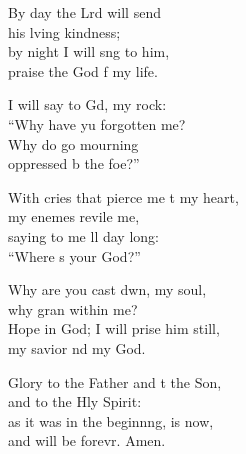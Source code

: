 \begin{psalmverse}[\versewidth]
\begin{patverse}
By day the Lrd will send\Med\\
his lving kindness;\\
by night I will s\pointup{\i}ng to him,\Med\\
praise the God f my life.

I will say to Gd, my rock:\Med\\
“Why have yu forgotten me?\\
Why do  go mourning\Med\\
oppressed b the foe?”

With cries that pierce me t my heart,\Med\\
my enem\pointup{\i}es revile me,\\
saying to me ll day long:\Med\\
“Where \pointup{\i}s your God?”

Why are you cast dwn, my soul,\Med\\
why gran within me?\\
Hope in God; I will prise him still,\Med\\
my savior nd my God.

Glory to the Father and t the Son,\Med\\
and to the Hly Spirit:\\
as it was in the beginn\pointup{\i}ng, is now,\Med\\
and will be forevr. Amen. 
  \end{patverse}
\end{psalmverse}
